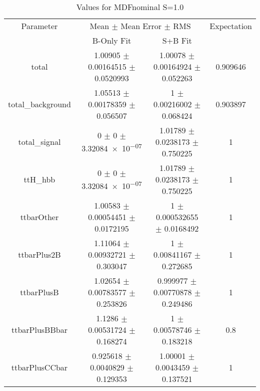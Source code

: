 \begin{table}
\centering
\caption{Values for MDFnominal S=1.0}
\begin{tabular}{cccc}
\toprule
Parameter & \multicolumn{2}{c}{Mean $\pm$ Mean Error $\pm$ RMS} & Expectation\\
 & B-Only Fit & S+B Fit & \\
\midrule
total & \num{1.00905} $\pm$ \num{0.00164515} $\pm$ \num{0.0520993} & \num{1.00078} $\pm$ \num{0.00164924} $\pm$ \num{0.052263} & \num{0.909646}\\
total\_background & \num{1.05513} $\pm$ \num{0.00178359} $\pm$ \num{0.056507} & \num{1} $\pm$ \num{0.00216002} $\pm$ \num{0.068424} & \num{0.903897}\\
total\_signal & \num{0} $\pm$ \num{0} $\pm$ \num{3.32084e-07} & \num{1.01789} $\pm$ \num{0.0238173} $\pm$ \num{0.750225} & \num{1}\\
ttH\_hbb & \num{0} $\pm$ \num{0} $\pm$ \num{3.32084e-07} & \num{1.01789} $\pm$ \num{0.0238173} $\pm$ \num{0.750225} & \num{1}\\
ttbarOther & \num{1.00583} $\pm$ \num{0.00054451} $\pm$ \num{0.0172195} & \num{1} $\pm$ \num{0.000532655} $\pm$ \num{0.0168492} & \num{1}\\
ttbarPlus2B & \num{1.11064} $\pm$ \num{0.00932721} $\pm$ \num{0.303047} & \num{1} $\pm$ \num{0.00841167} $\pm$ \num{0.272685} & \num{1}\\
ttbarPlusB & \num{1.02654} $\pm$ \num{0.00783577} $\pm$ \num{0.253826} & \num{0.999977} $\pm$ \num{0.00770878} $\pm$ \num{0.249486} & \num{1}\\
ttbarPlusBBbar & \num{1.1286} $\pm$ \num{0.00531724} $\pm$ \num{0.168274} & \num{1} $\pm$ \num{0.00578746} $\pm$ \num{0.183218} & \num{0.8}\\
ttbarPlusCCbar & \num{0.925618} $\pm$ \num{0.0040829} $\pm$ \num{0.129353} & \num{1.00001} $\pm$ \num{0.0043459} $\pm$ \num{0.137521} & \num{1}\\
\bottomrule
\end{tabular}
\end{table}